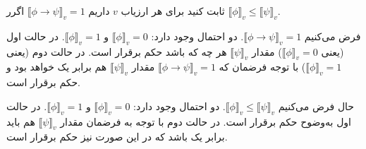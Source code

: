 ثابت کنید برای هر ارزیاب $v$ داریم
$\llbracket \phi\to\psi\rrbracket_v=1$
اگرر
$\llbracket\phi\rrbracket_v\leq\llbracket\psi\rrbracket_v$.
\begin{ans}
فرض می‌کنیم $\llbracket \phi\to\psi\rrbracket_v=1$. دو احتمال وجود دارد:
$\llbracket\phi\rrbracket_v=0$
و
$\llbracket\phi\rrbracket_v=1$.
در حالت اول (یعنی
$\llbracket\phi\rrbracket_v=0$)
مقدار $\llbracket\psi\rrbracket_v$ هر چه که باشد حکم برقرار است. در حالت دوم (یعنی
$\llbracket\phi\rrbracket_v=1$)
با توجه فرضمان که
$\llbracket \phi\to\psi\rrbracket_v=1$
مقدار
$\llbracket\psi\rrbracket_v$
هم برابر یک خواهد بود و حکم برقرار است.

حال فرض می‌کنیم $\llbracket\phi\rrbracket_v\leq\llbracket\psi\rrbracket_v$. دو احتمال وجود دارد:
$\llbracket\phi\rrbracket_v=0$
و
$\llbracket\phi\rrbracket_v=1$.
در حالت اول به‌وضوح حکم برقرار است. در حالت دوم با توجه به فرضمان مقدار
$\llbracket\psi\rrbracket_v$
هم باید برابر یک باشد که در این صورت نیز حکم برقرار است.
\end{ans}
